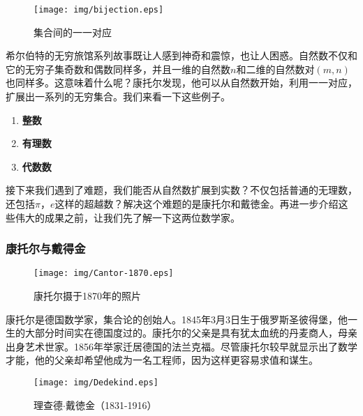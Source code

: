 \documentclass{article}
\begin{document}
\begin{figure}[htbp]
 \centering
 \texttt{[image: img/bijection.eps]}
 \caption{集合间的一一对应}
 \label{fig:bijection}
\end{figure}

希尔伯特的无穷旅馆系列故事既让人感到神奇和震惊，也让人困惑。自然数不仅和它的无穷子集奇数和偶数同样多，并且一维的自然数$n$和二维的自然数对$(m, n)$也同样多。这意味着什么呢？康托尔发现，他可以从自然数开始，利用一一对应，扩展出一系列的无穷集合。我们来看一下这些例子。

\begin{enumerate}
\item \textbf{整数}
\item \textbf{有理数}
\item \textbf{代数数}
\end{enumerate}

接下来我们遇到了难题，我们能否从自然数扩展到实数？不仅包括普通的无理数，还包括$\pi$，$e$这样的超越数？解决这个难题的是康托尔和戴徳金。再进一步介绍这些伟大的成果之前，让我们先了解一下这两位数学家。

\subsubsection{康托尔与戴得金}

\begin{wrapfigure}{R}{0.4\textwidth}
 \centering
 \texttt{[image: img/Cantor-1870.eps]}
 \captionsetup{labelformat=empty}
 \caption{康托尔摄于1870年的照片}
 \label{fig:Cantor-1870}
\end{wrapfigure}

康托尔是德国数学家，集合论的创始人。1845年3月3日生于俄罗斯圣彼得堡，他一生的大部分时间实在德国度过的。康托尔的父亲是具有犹太血统的丹麦商人，母亲出身艺术世家。1856年举家迁居德国的法兰克福。尽管康托尔较早就显示出了数学才能，他的父亲却希望他成为一名工程师，因为这样更容易求值和谋生。

\begin{wrapfigure}{L}{0.4\textwidth}
 \centering
 \texttt{[image: img/Dedekind.eps]}
 \captionsetup{labelformat=empty}
 \caption{理查德$\cdot$戴徳金（1831-1916）}
 \label{fig:Dedekind}
\end{wrapfigure}
\end{document}
